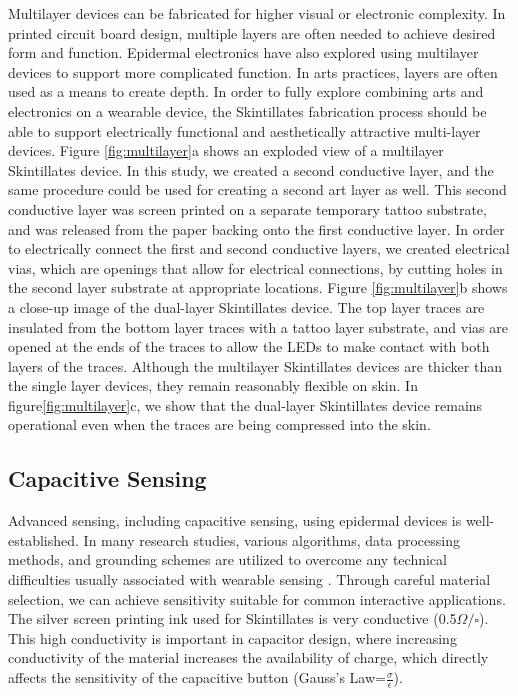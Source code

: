 \documentclass{sigchi}
\begin{document}
Multilayer devices can be fabricated for higher visual or electronic complexity. In printed circuit board design, multiple layers are often needed to achieve desired form and function. Epidermal electronics have also explored using multilayer devices to support more complicated function. In arts practices, layers are often used as a means to create depth. In order to fully explore combining arts and electronics on a wearable device, the Skintillates fabrication process should be able to support electrically functional and aesthetically attractive multi-layer devices. Figure \ref{fig:multilayer}a shows an exploded view of a multilayer Skintillates device. In this study, we created a second conductive layer, and the same procedure could be used for creating a second art layer as well. This second conductive layer was screen printed on a separate temporary tattoo substrate, and was released from the paper backing onto the first conductive layer. In order to electrically connect the first and second conductive layers, we created electrical vias, which are openings that allow for electrical connections, by cutting holes in the second layer substrate at appropriate locations. Figure \ref{fig:multilayer}b shows a close-up image of the dual-layer Skintillates device. The top layer traces are insulated from the bottom layer traces with a tattoo layer substrate, and vias are opened at the ends of the traces to allow the LEDs to make contact with both layers of the traces. Although the multilayer Skintillates devices are thicker than the single layer devices, they remain reasonably flexible on skin. In figure\ref{fig:multilayer}c, we show that the dual-layer Skintillates device remains operational even when the traces are being compressed into the skin. 
\subsection{Capacitive Sensing}
Advanced sensing, including capacitive sensing, using epidermal devices is well-established\cite{Jeong:2013km,Frutiger:2015fm,Mannsfeld:2010is}. In many research studies, various algorithms, data processing methods, and grounding schemes are utilized to overcome any technical difficulties usually associated with wearable sensing \cite{Jeong:2013km}.  Through careful material selection, we can achieve sensitivity suitable for common interactive applications. The silver screen printing ink used for Skintillates is very conductive (0.5$\Omega/\square$). 
 This high conductivity is important in capacitor design, where increasing conductivity of the material increases the availability of charge, which directly affects the sensitivity of the capacitive button (Gauss’s Law=$\frac{\sigma}{\epsilon}$).
\end{document}
